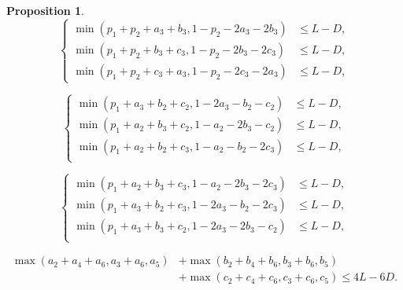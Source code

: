 \documentclass[a4paper,11pt,twoside,reqno]{amsart}
\renewcommand{\le}{\leqslant}
\theoremstyle{plain}
\newtheorem{prop}{Proposition}
\theoremstyle{remark}
\numberwithin{prop}{section}
\numberwithin{equation}{section}
\begin{document}
\begin{prop}
\medskip

\begin{equation}\label{eq:7}
\left\{
\begin{aligned}
        \min(p_1+p_2+a_3+b_3,1-p_2-2a_3-2b_3) &\le L-D,\\
        \min(p_1+p_2+b_3+c_3,1-p_2-2b_3-2c_3) &\le L-D,\\
        \min(p_1+p_2+c_3+a_3,1-p_2-2c_3-2a_3) &\le L-D,
\end{aligned}
\right.
\end{equation}

\medskip

\begin{equation}\label{eq:8}
\left\{
\begin{aligned}
        \min(p_1+a_3+b_2+c_2,1-2a_3-b_2-c_2) &\le L-D,\\
        \min(p_1+a_2+b_3+c_2,1-a_2-2b_3-c_2) &\le L-D,\\
        \min(p_1+a_2+b_2+c_3,1-a_2-b_2-2c_3) &\le L-D,\\
\end{aligned}
\right.
\end{equation}

\medskip

\begin{equation}\label{eq:9}
\left\{
\begin{aligned}
        \min(p_1+a_2+b_3+c_3,1-a_2-2b_3-2c_3) &\le L-D,\\
        \min(p_1+a_3+b_2+c_3,1-2a_3-b_2-2c_3) &\le L-D,\\
        \min(p_1+a_3+b_3+c_2,1-2a_3-2b_3-c_2) &\le L-D,\\
\end{aligned}
\right.
\end{equation}

\medskip

\begin{equation}\label{eq:10}
\begin{split}
        \max(a_2+a_4+a_6,a_3+a_6,a_5)&+\max(b_2+b_4+b_6,b_3+b_6,b_5)\\
        &+\max(c_2+c_4+c_6,c_3+c_6,c_5) 
        \le 4L-6D.
\end{split}
\end{equation}
\end{prop}
\end{document}
